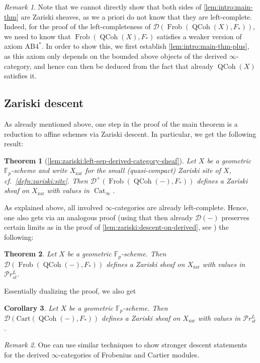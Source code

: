 \documentclass{article}
\theoremstyle{definition}
\theoremstyle{definition}
\theoremstyle{definition}
\theoremstyle{plain}
\theoremstyle{plain}
\theoremstyle{plain}
\theoremstyle{plain}
\theoremstyle{plain}
\theoremstyle{plain}
\theoremstyle{plain}
\theoremstyle{plain}
\theoremstyle{remark}
\theoremstyle{remark}
\newtheorem*{rmk*}{Remark}
\theoremstyle{plain}
\newtheorem{introthm}{Theorem}
\theoremstyle{plain}
\theoremstyle{plain}
\newtheorem{introcor}[introthm]{Corollary}
\theoremstyle{plain}
\theoremstyle{plain}
\newcommand{\Fp}{\mathbb{F}_p}
\newcommand{\QCoh}[1]{\operatorname{QCoh}(#1)}
\newcommand{\Frob}[2]{\operatorname{Frob}(#1, #2)}
\newcommand{\Cat}[1]{\mathcal{#1}}
\newcommand{\CatInf}{\operatorname{Cat}_{\infty}}
\newcommand{\PrSt}{\mathcal{P}r^{L}_{st}}
\newcommand{\zar}{\operatorname{zar}}
\begin{document}
\begin{rmk*}
    Note that we cannot directly show that both sides of \cref{lem:intro:main-thm} 
    are Zariski sheaves, as we a priori do not know that they are left-complete.
    Indeed, for the proof of the left-completeness of $\Cat D(\Frob{\QCoh{X}}{F_*})$,
    we need to know that $\Frob{\QCoh{X}}{F_*}$ satisfies a weaker version of axiom
    $\mathrm{AB}4^*$. In order to show this, we first establish 
    \cref{lem:intro:main-thm-plus}, as this axiom only depends on the bounded above objects 
    of the derived $\infty$-category, and hence can then be deduced from the fact that already 
    $\QCoh{X}$ satisfies it.
\end{rmk*}

\subsection*{Zariski descent}
As already mentioned above, one step in the proof of the main theorem is a reduction to affine schemes
via Zariski descent. In particular, we get the following result:
\begin{introthm} [{\cref{lem:zariski:left-sep-derived-category-sheaf}}]
    Let $X$ be a geometric $\Fp$-scheme and write $X_{\zar}$ for the small (quasi-compact) Zariski site of $X$, cf.\ \cref{defn:zariski:site}.
    Then $\Cat D^+(\Frob{\QCoh{-}}{F_*})$ defines a Zariski sheaf on $X_{\zar}$ with values in $\CatInf$.
\end{introthm}
As explained above, all involved $\infty$-categories are already left-complete.
Hence, one also gets via an analogous proof (using that then 
already $\Cat D(-)$ preserves certain limits as 
in the proof of \cref{lem:zariski:descent-on-derived},
see \cite[Proposition A.4.23]{heyer20246}) the following:
\begin{introthm}
    Let $X$ be a geometric $\Fp$-scheme.
    Then $\Cat D(\Frob{\QCoh{-}}{F_*})$ defines a Zariski sheaf on $X_{\zar}$ 
    with values in $\PrSt$.
\end{introthm}
Essentially dualizing the proof, we also get 
\begin{introcor}
    Let $X$ be a geometric $\Fp$-scheme. 
    Then $\Cat D(\mathrm{Cart}(\QCoh{-},F_*))$ defines a Zariski sheaf on $X_{\zar}$ with values in $\PrSt$.
\end{introcor}
\begin{rmk*}
    One can use similar techniques to show stronger descent statements for the derived 
    $\infty$-categories of Frobenius and Cartier modules.
\end{rmk*}
\end{document}
